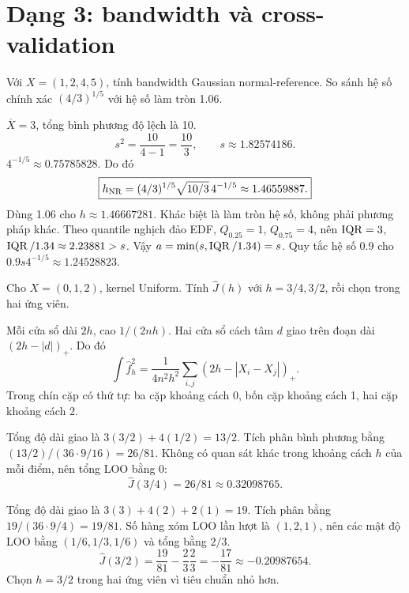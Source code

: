\section{Dạng 3: bandwidth và cross-validation}
\begin{exercise}
Với $X=(1,2,4,5)$, tính bandwidth Gaussian normal-reference.
So sánh hệ số chính xác $(4/3)^{1/5}$ với hệ số làm tròn 1.06.
\end{exercise}
\begin{solution}
$\overline X=3$, tổng bình phương độ lệch là 10.
\[
s^2=\frac{10}{4-1}=\frac{10}{3},\qquad s\approx1.82574186.
\]
$4^{-1/5}\approx0.75785828$. Do đó
\[
\boxed{h_{\rm NR}=(4/3)^{1/5}\sqrt{10/3}\,4^{-1/5}
\approx1.46559887.}
\]
Dùng 1.06 cho $h\approx1.46667281$. Khác biệt là làm tròn hệ số,
không phải phương pháp khác.
Theo quantile nghịch đảo EDF, $Q_{0.25}=1$, $Q_{0.75}=4$, nên
$\operatorname{IQR}=3$, $\operatorname{IQR}/1.34\approx2.23881>s$.
Vậy $a=\min(s,\operatorname{IQR}/1.34)=s$. Quy tắc hệ số $0.9$ cho
$0.9s4^{-1/5}\approx1.24528823$.
\end{solution}

\begin{exercise}
Cho $X=(0,1,2)$, kernel Uniform. Tính $\widehat J(h)$ với
$h=3/4,3/2$, rồi chọn trong hai ứng viên.
\end{exercise}
\begin{solution}
Mỗi cửa sổ dài $2h$, cao $1/(2nh)$. Hai cửa sổ cách tâm $d$ giao trên
đoạn dài $(2h-|d|)_+$. Do đó
\[
\int\widehat f_h^2=\frac1{4n^2h^2}\sum_{i,j}(2h-|X_i-X_j|)_+.
\]
Trong chín cặp có thứ tự: ba cặp khoảng cách 0, bốn cặp khoảng cách 1,
hai cặp khoảng cách 2.

Tổng độ dài giao là $3(3/2)+4(1/2)=13/2$.
Tích phân bình phương bằng $(13/2)/(36\cdot9/16)=26/81$.
Không có quan sát khác trong khoảng cách $h$ của mỗi điểm, nên tổng
LOO bằng 0:
\[
\boxed{\widehat J(3/4)=26/81\approx0.32098765.}
\]

Tổng độ dài giao là $3(3)+4(2)+2(1)=19$.
Tích phân bằng $19/(36\cdot9/4)=19/81$.
Số hàng xóm LOO lần lượt là $(1,2,1)$, nên các mật độ LOO bằng
$(1/6,1/3,1/6)$ và tổng bằng $2/3$.
\[
\boxed{\widehat J(3/2)=\frac{19}{81}-\frac23\frac23
=-\frac{17}{81}\approx-0.20987654.}
\]
Chọn $\boxed{h=3/2}$ trong hai ứng viên vì tiêu chuẩn nhỏ hơn.
\end{solution}


